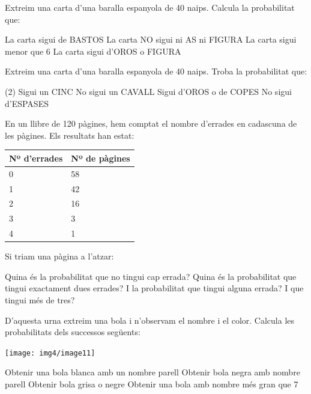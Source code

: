 \begin{mylist}
\exer \spen  Extreim una carta d'una baralla espanyola de 40 naips. Calcula la probabilitat que:
\begin{tasks} 
\task  La carta sigui de BASTOS
\task  La carta NO sigui ni AS ni FIGURA
\task  La carta sigui menor que 6
\task  La carta sigui d'OROS o FIGURA
\end{tasks}
 
 \exer  Extreim una carta d'una baralla espanyola de 40 naips. Troba la probabilitat que:
 \begin{tasks}(2)
 	\task  Sigui un CINC    
 	\task  No sigui un CAVALL
 	\task     Sigui d'OROS o de COPES   
 	\task  No sigui d'ESPASES
 \end{tasks}
\newpage

 \exer[1] En un llibre de 120 pàgines, hem comptat el nombre d'errades en cadascuna de les pàgines. Els resultats han estat: 

\begin{longtable}{|p{2.3in}|p{1.4in}|} \hline 
\textbf{Nº d'errades} & \textbf{Nº de pàgines} \\ \hline 
0 & 58 \\ \hline 
1 & 42 \\ \hline 
2 & 16 \\ \hline 
3 & 3 \\ \hline 
4 & 1 \\ \hline 
\end{longtable}

Si triam una pàgina a l'atzar:
\begin{tasks} 
	\task  Quina és la probabilitat que no tingui cap errada?
	\task  Quina és la probabilitat que tingui exactament dues errades?
	\task  I la probabilitat que tingui alguna errada? I que tingui més de tres?
\end{tasks}
 

  

\exer  D'aquesta urna extreim una bola i n'observam el nombre i el color. Calcula les probabilitats dels successos següents:
\begin{center}
	\texttt{[image: img4/image11]}
\end{center}
\begin{tasks} 
	\task  Obtenir una bola blanca amb un nombre parell
	\task  Obtenir bola negra amb nombre parell
	\task  Obtenir bola grisa o negre
	\task  Obtenir una bola amb nombre més gran que 7
\end{tasks}


\end{mylist}
